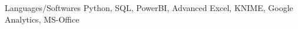 
\begin{cvskills}
  \cvskill
    {Languages/Softwares} %
    {Python, SQL, PowerBI, Advanced Excel, KNIME, Google Analytics, MS-Office} %

 
\end{cvskills}
